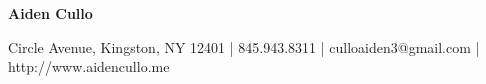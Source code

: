 \documentclass{article}
\begin{document}
\newcommand{\ts}{\textsuperscript}

\centerline{\huge \textbf{Aiden Cullo}} Circle Avenue, Kingston, NY 12401 | 845.943.8311 | culloaiden3@gmail.com | http://www.aidencullo.me\newline
\end{document}
